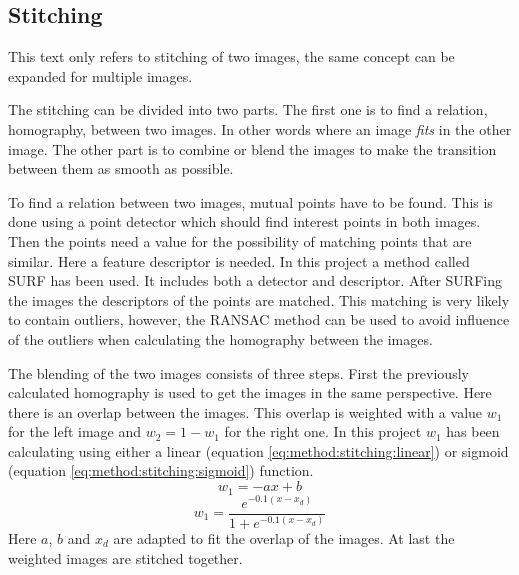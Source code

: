 \subsection{Stitching}
This text only refers to stitching of two images, the same concept can be expanded for multiple images.

The stitching can be divided into two parts.
The first one is to find a relation, homography, between two images.
In other words where an image {\it fits} in the other image.
The other part is to combine or blend the images to make the transition between them as smooth as possible.

To find a relation between two images, mutual points have to be found.
This is done using a point detector which should find interest points in both images.
Then the points need a value for the possibility of matching points that are similar.
Here a feature descriptor is needed.
In this project a method called SURF has been used.
It includes both a detector and descriptor.
After SURFing the images the descriptors of the points are matched.
This matching is very likely to contain outliers, however, the RANSAC method can be used to avoid influence of the outliers when calculating the homography between the images.

The blending of the two images consists of three steps.
First the previously calculated homography is used to get the images in the same perspective.
Here there is an overlap between the images.
This overlap is weighted with a value $w_1$ for the left image and $w_2 = 1 - w_1$ for the right one.
In this project $w_1$ has been calculating using either a linear (equation \ref{eq:method:stitching:linear}) or sigmoid (equation \ref{eq:method:stitching:sigmoid}) function.
\begin{equation} \label{eq:method:stitching:linear}
  w_1 = -a x + b
\end{equation}
\begin{equation} \label{eq:method:stitching:sigmoid}
  w_1 = \frac{e^{-0.1(x - x_d)}}{1 + e^{-0.1(x - x_d)}}
\end{equation}
Here $a$, $b$ and $x_d$ are adapted to fit the overlap of the images.
At last the weighted images are stitched together.

